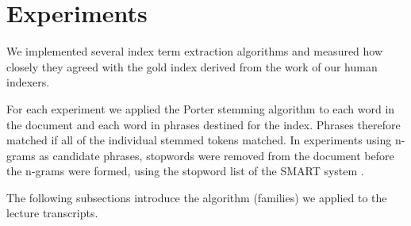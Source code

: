 \section{Experiments}
\label{sec:exp}



We implemented several index term extraction algorithms and measured
how closely they agreed with the gold index derived from the work of
our human indexers.


For each experiment we applied the Porter stemming algorithm to each
word in the document and each word in phrases destined for the index.
Phrases therefore matched if all of the individual stemmed tokens
matched. In experiments using n-grams as candidate phrases, stopwords
were removed from the document before the n-grams were formed, using
the stopword list of the SMART system \cite{salton1971smart}.


The following subsections introduce the algorithm (families) we
applied to the lecture transcripts.
